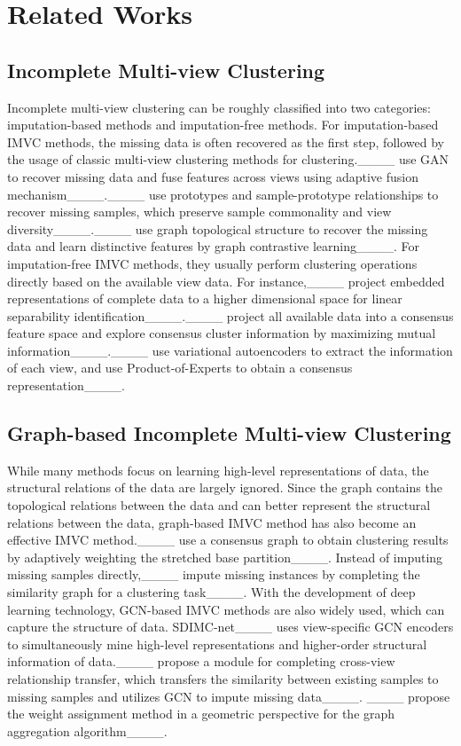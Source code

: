 \section{Related Works}
\subsection{Incomplete Multi-view Clustering}
Incomplete multi-view clustering can be roughly classified into two categories: imputation-based methods and imputation-free methods. For imputation-based IMVC methods, the missing data is often recovered as the first step, followed by the usage of classic multi-view clustering methods for clustering.____ use GAN to recover missing data and fuse features across views using adaptive fusion mechanism____.____ use prototypes and sample-prototype relationships to recover missing samples, which preserve sample commonality and view diversity____.____ use graph topological structure to recover the missing data and learn distinctive features by graph contrastive learning____. For imputation-free IMVC methods, they usually perform clustering operations directly based on the available view data. For instance,____ project embedded representations of complete data to a higher dimensional space for linear separability identification____.____ project all available data into a consensus feature space and explore consensus cluster information by maximizing mutual information____.____ use variational autoencoders to extract the information of each view, and use Product-of-Experts to obtain a consensus representation____.

\subsection{Graph-based Incomplete Multi-view Clustering}
While many methods focus on learning high-level representations of data, the structural relations of the data are largely ignored. Since the graph contains the topological relations between the data and can better represent the structural relations between the data, graph-based IMVC method has also become an effective IMVC method.____ use a consensus graph to obtain clustering results by adaptively weighting the stretched base partition____. Instead of imputing missing samples directly,____ impute missing instances by completing the similarity graph for a clustering task____. With the development of deep learning technology, GCN-based IMVC methods are also widely used, which can capture the structure of data. SDIMC-net____ uses view-specific GCN encoders to simultaneously mine high-level representations and higher-order structural information of data.____ propose a module for completing cross-view relationship transfer, which transfers the similarity between existing samples to missing samples and utilizes GCN to impute missing data____. ____ propose the weight assignment method in a geometric perspective for the graph aggregation algorithm____.